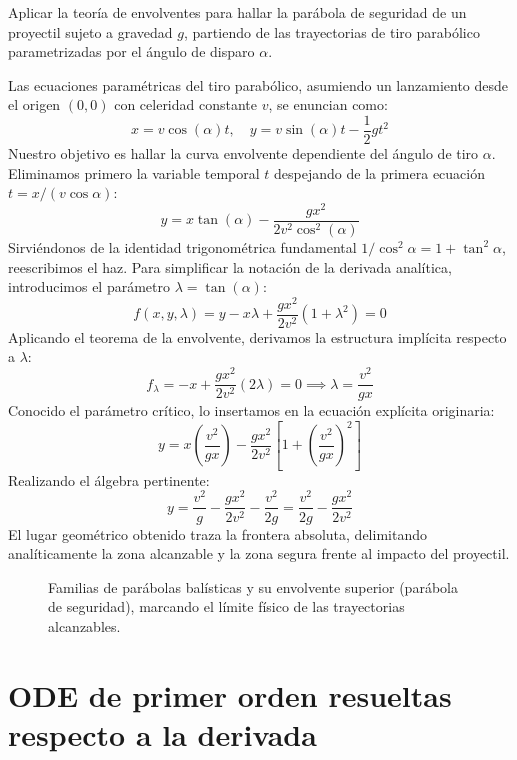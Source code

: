 \vspace{0.4cm}
\begin{ejercicio}
Aplicar la teoría de envolventes para hallar la parábola de seguridad de un proyectil sujeto a gravedad $g$, partiendo de las trayectorias de tiro parabólico parametrizadas por el ángulo de disparo $\alpha$.
\end{ejercicio}

\begin{tcolorbox}
Las ecuaciones paramétricas del tiro parabólico, asumiendo un lanzamiento desde el origen $(0,0)$ con celeridad constante $v$, se enuncian como:
$$ x = v \cos(\alpha)t, \quad y = v \sin(\alpha)t - \frac{1}{2}gt^2 $$
Nuestro objetivo es hallar la curva envolvente dependiente del ángulo de tiro $\alpha$. Eliminamos primero la variable temporal $t$ despejando de la primera ecuación $t = x/(v \cos\alpha)$:
$$ y = x \tan(\alpha) - \frac{gx^2}{2v^2 \cos^2(\alpha)} $$
Sirviéndonos de la identidad trigonométrica fundamental $1/\cos^2\alpha = 1 + \tan^2\alpha$, reescribimos el haz. Para simplificar la notación de la derivada analítica, introducimos el parámetro $\lambda = \tan(\alpha)$:
$$ f(x, y, \lambda) = y - x\lambda + \frac{gx^2}{2v^2}(1+\lambda^2) = 0 $$
Aplicando el teorema de la envolvente, derivamos la estructura implícita respecto a $\lambda$:
$$ f_\lambda = -x + \frac{gx^2}{2v^2}(2\lambda) = 0 \implies \lambda = \frac{v^2}{gx} $$
Conocido el parámetro crítico, lo insertamos en la ecuación explícita originaria:
$$ y = x\left(\frac{v^2}{gx}\right) - \frac{gx^2}{2v^2}\left[ 1 + \left(\frac{v^2}{gx}\right)^2 \right] $$
Realizando el álgebra pertinente:
$$ y = \frac{v^2}{g} - \frac{gx^2}{2v^2} - \frac{v^2}{2g} = \frac{v^2}{2g} - \frac{gx^2}{2v^2} $$
El lugar geométrico obtenido traza la frontera absoluta, delimitando analíticamente la zona alcanzable y la zona segura frente al impacto del proyectil.

\begin{figure}[H]
    \centering
    
    \caption{Familias de parábolas balísticas y su envolvente superior (parábola de seguridad), marcando el límite físico de las trayectorias alcanzables.}
\end{figure}
\end{tcolorbox}
\newpage

\section{ODE de primer orden resueltas respecto a la derivada}

